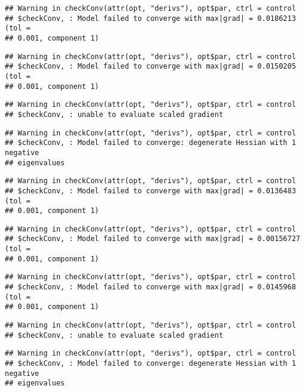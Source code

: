 \documentclass[]{article}
\begin{document}
\begin{verbatim}
## Warning in checkConv(attr(opt, "derivs"), opt$par, ctrl = control
## $checkConv, : Model failed to converge with max|grad| = 0.0186213 (tol =
## 0.001, component 1)
\end{verbatim}

\begin{verbatim}
## Warning in checkConv(attr(opt, "derivs"), opt$par, ctrl = control
## $checkConv, : Model failed to converge with max|grad| = 0.0150205 (tol =
## 0.001, component 1)
\end{verbatim}

\begin{verbatim}
## Warning in checkConv(attr(opt, "derivs"), opt$par, ctrl = control
## $checkConv, : unable to evaluate scaled gradient
\end{verbatim}

\begin{verbatim}
## Warning in checkConv(attr(opt, "derivs"), opt$par, ctrl = control
## $checkConv, : Model failed to converge: degenerate Hessian with 1 negative
## eigenvalues
\end{verbatim}

\begin{verbatim}
## Warning in checkConv(attr(opt, "derivs"), opt$par, ctrl = control
## $checkConv, : Model failed to converge with max|grad| = 0.0136483 (tol =
## 0.001, component 1)
\end{verbatim}

\begin{verbatim}
## Warning in checkConv(attr(opt, "derivs"), opt$par, ctrl = control
## $checkConv, : Model failed to converge with max|grad| = 0.00156727 (tol =
## 0.001, component 1)
\end{verbatim}

\begin{verbatim}
## Warning in checkConv(attr(opt, "derivs"), opt$par, ctrl = control
## $checkConv, : Model failed to converge with max|grad| = 0.0145968 (tol =
## 0.001, component 1)
\end{verbatim}

\begin{verbatim}
## Warning in checkConv(attr(opt, "derivs"), opt$par, ctrl = control
## $checkConv, : unable to evaluate scaled gradient
\end{verbatim}

\begin{verbatim}
## Warning in checkConv(attr(opt, "derivs"), opt$par, ctrl = control
## $checkConv, : Model failed to converge: degenerate Hessian with 1 negative
## eigenvalues
\end{verbatim}
\end{document}
